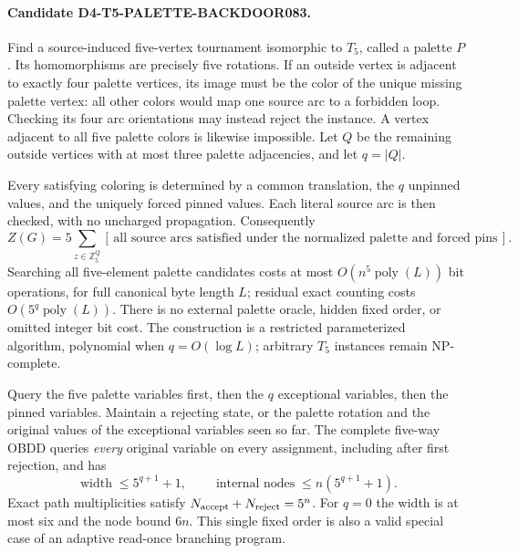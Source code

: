 \documentclass[11pt]{article}
\begin{document}
\paragraph{Candidate D4-T5-PALETTE-BACKDOOR083.}
Find a source-induced five-vertex tournament isomorphic to
$T_5$, called a palette $P$. Its homomorphisms are precisely
five rotations. If an outside vertex is adjacent to exactly
four palette vertices, its image must be the color of the
unique missing palette vertex: all other colors would map
one source arc to a forbidden loop. Checking its four arc
orientations may instead reject the instance. A vertex
adjacent to all five palette colors is likewise impossible.
Let $Q$ be the remaining outside vertices with at most
three palette adjacencies, and let $q=|Q|$.

Every satisfying coloring is determined by a common
translation, the $q$ unpinned values, and the uniquely
forced pinned values. Each literal source arc is then
checked, with no uncharged propagation. Consequently
\[
 Z(G)=5\sum_{z\in \mathbb Z_5^{Q}}
 [\,\text{all source arcs satisfied under the normalized
 palette and forced pins}\,].
\]
Searching all five-element palette candidates costs at most
$O(n^5\operatorname{poly}(L))$ bit operations, for full
canonical byte length $L$; residual exact counting costs
$O(5^q\operatorname{poly}(L))$. There is no external
palette oracle, hidden fixed order, or omitted integer
bit cost. The construction is a restricted parameterized
algorithm, polynomial when $q=O(\log L)$; arbitrary
$T_5$ instances remain NP-complete.

Query the five palette variables first, then the $q$
exceptional variables, then the pinned variables. Maintain
a rejecting state, or the palette rotation and the
original values of the exceptional variables seen so far.
The complete five-way OBDD queries \emph{every} original
variable on every assignment, including after first
rejection, and has
\[
 \operatorname{width}\le5^{q+1}+1,\qquad
 \operatorname{internal\ nodes}\le n(5^{q+1}+1).
\]
Exact path multiplicities satisfy
$N_{\rm accept}+N_{\rm reject}=5^n$. For $q=0$ the
width is at most six and the node bound $6n$.
This single fixed order is also a valid special case
of an adaptive read-once branching program.
\end{document}
